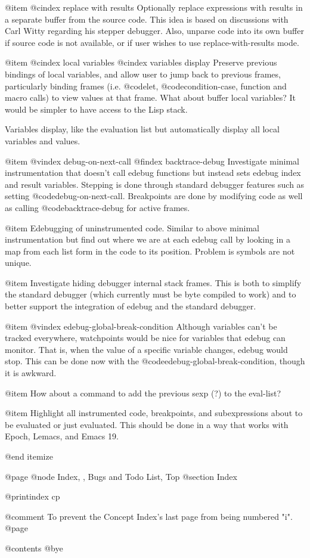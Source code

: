 @item
@cindex replace with results
Optionally replace expressions with results in a separate buffer from
the source code.  This idea is based on discussions with Carl Witty
regarding his stepper debugger.  Also, unparse code into its own buffer
if source code is not available, or if user wishes to use
replace-with-results mode.

@item
@cindex local variables
@cindex variables display
Preserve previous bindings of local variables, and allow user to jump
back to previous frames, particularly binding frames (i.e. @code{let},
@code{condition-case}, function and macro calls) to view values at that
frame.  What about buffer local variables?  It would be simpler to have
access to the Lisp stack.

Variables display, like the evaluation list but automatically display
all local variables and values.

@item
@vindex debug-on-next-call
@findex backtrace-debug
Investigate minimal instrumentation that doesn't call edebug functions
but instead sets edebug index and result variables.  Stepping is done
through standard debugger features such as setting
@code{debug-on-next-call}.  Breakpoints are done by modifying code as
well as calling @code{backtrace-debug} for active frames.

@item
Edebugging of uninstrumented code.  Similar to above minimal
instrumentation but find out where we are at each edebug call by looking
in a map from each list form in the code to its position.
Problem is symbols are not unique.

@item
Investigate hiding debugger internal stack frames.  This is both to
simplify the standard debugger (which currently must be byte compiled to
work) and to better support the integration of edebug and the standard
debugger.

@item
@vindex edebug-global-break-condition
Although variables can't be tracked everywhere, watchpoints would be
nice for variables that edebug can monitor.  That is, when the value of
a specific variable changes, edebug would stop.  This can be done now
with the @code{edebug-global-break-condition}, though it is awkward.

@item
How about a command to add the previous sexp (?) to the eval-list?

@item
Highlight all instrumented code, breakpoints, and subexpressions about
to be evaluated or just evaluated.  This should be done in a way that
works with Epoch, Lemacs, and Emacs 19.

@end itemize


@page
@node Index,  , Bugs and Todo List, Top
@section Index

@printindex cp

@comment To prevent the Concept Index's last page from being numbered "i".
@page

@contents
@bye
